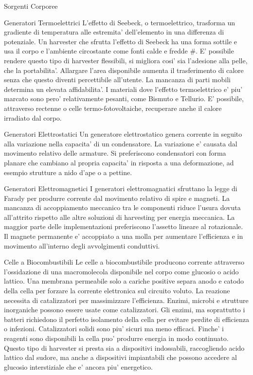 \begin{section}{Sorgenti Corporee}
   \begin{subsection}{Generatori Termoelettrici}
    L'effetto di Seebeck, o termoelettrico, trasforma un gradiente di temperatura alle estremita' dell'elemento in una differenza di potenziale. Un harvester che sfrutta l'effetto di Seebeck ha una forma sottile e usa il corpo e l'ambiente circostante come fonti calde e fredde \#. E' possibile rendere questo tipo di harvester flessibili, si migliora cosi' sia l'adesione alla pelle, che la portabilita'. Allargare l'area disponibile aumenta il trasferimento di calore senza che questo diventi percettibile all'utente. La mancanza di parti mobili determina un elevata affidabilita'. I materiali dove l'effetto termoelettrico e' piu' marcato sono pero' relativamente pesanti, come Bismuto e Tellurio. E' possibile, attraverso rectenne o celle termo-fotovoltaiche, recuperare anche il calore irradiato dal corpo.
   \end{subsection}

   \begin{subsection}{Generatori Elettrostatici}
    Un generatore elettrostatico genera corrente in seguito alla variazione nella capacita' di un condensatore. La variazione e' causata dal movimento relativo delle armature. Si preferiscono condensatori con forma planare che cambiano al propria capacita' in risposta a una deformazione, ad esempio strutture a nido d'ape o a pettine.
   \end{subsection}

   \begin{subsection}{Generatori Elettromagnetici}
    I generatori elettromagnatici sfruttano la legge di Farady per produrre corrente dal movimento relativo di spire e magneti. La mancanza di accoppiamento meccanico tra le componenti riduce l'usura dovuta all'attrito rispetto alle altre soluzioni di harvesting per energia meccanica. La maggior parte delle implementazioni preferiscono l'assetto lineare al rotazionale. Il magnete permanente e' accoppiato a una molla per aumentare l'efficienza e in movimento all'interno degli avvolgimenti conduttivi.
   \end{subsection}
   
   \begin{subsection}{Celle a Biocombustibili}
    Le celle a biocombustibile producono corrente attraverso l'ossidazione di una macromolecola disponibile nel corpo come glucosio o acido lattico. Una membrana permeabile solo a cariche positive separa anodo e catodo della cella per forzare la corrente elettronica sul circuito voluto. La reazione necessita di catalizzatori per massimizzare l'efficienza. Enzimi, microbi e strutture inorganiche possono essere usate come catalizzatori. Gli enzimi, ma soprattutto i batteri richiedono il perfetto isolamento della cella per evitare perdite di efficienza o infezioni. Catalizzatori solidi sono piu' sicuri ma meno efficaci. Finche' i reagenti sono disponibili la cella puo' produrre energia in modo continuato. Questo tipo di harvester si presta sia a dispositivi indossabili, raccogliendo acido lattico dal sudore, ma anche a dispositivi impiantabili che possono accedere al glucosio interstiziale che e' ancora piu' energetico. 
   \end{subsection}


\end{section}
